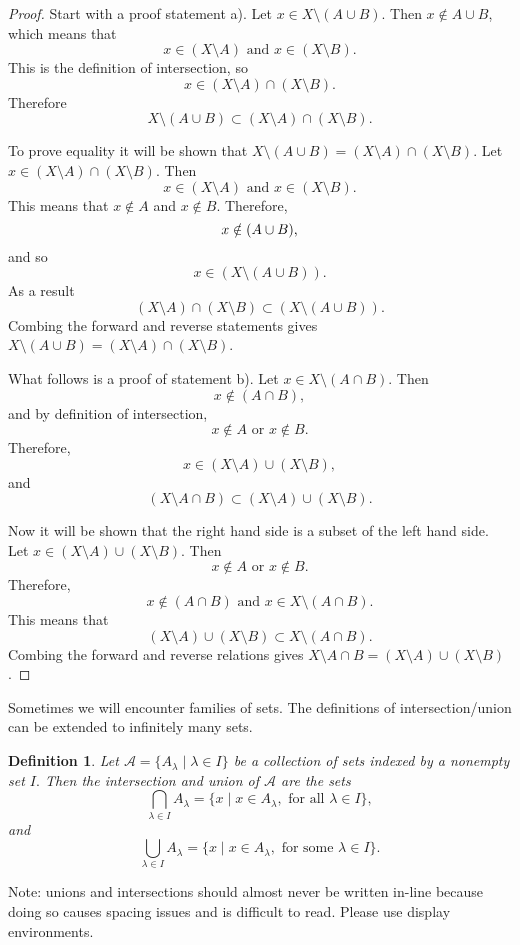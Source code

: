 \documentclass{amsart}
\newtheorem{definition}[theorem]{Definition}
\newcommand{\1}{\mathds{1}}
\numberwithin{equation}{section}
\numberwithin{theorem}{section}
\begin{document}
\begin{proof}
	Start with a proof statement a). Let $x\in X\setminus (A\cup B)$. Then $x\notin A\cup B$, which means that 
	\[x\in (X\setminus A) \text{ and } x\in (X\setminus B).\] This is the definition of intersection, so
	\[x\in (X\setminus A)\cap (X\setminus B).\] 
	Therefore
	\[X\setminus (A\cup B)\subset (X\setminus A)\cap (X\setminus B).\]
	
	To prove equality it will be shown that $X\setminus (A\cup B)=(X\setminus A)\cap (X\setminus B)$. Let $x\in (X\setminus A)\cap (X\setminus B)$. Then 
	\[x\in(X\setminus A) \text{ and } x\in (X\setminus B).\]
	This means that $x\notin A$ and $x\notin B$. Therefore, 
	\[x\notin (A\cup B) \text,\] and so 
	$$x\in (X\setminus (A\cup B)).$$
	As a result $$(X\setminus A)\cap (X\setminus B)\subset (X\setminus (A\cup B)).$$ 
	Combing the forward and reverse statements gives $X\setminus (A\cup B)=(X\setminus A)\cap (X\setminus B)$.
	
	What follows is a proof of statement b). Let $x\in X\setminus (A\cap B)$. Then $$x\notin (A\cap B),$$ and by definition of intersection, $$x\notin A \text{ or } x\notin B.$$ Therefore, $$x\in (X\setminus A)\cup (X\setminus B),$$ and $$(X\setminus A\cap B)\subset (X\setminus A)\cup (X\setminus B).$$ 
	
	Now it will be shown that the right hand side is a subset of the left hand side. Let $x\in (X\setminus A)\cup (X\setminus B)$. Then $$x\notin A \text{ or } x\notin B.$$ Therefore, $$x\notin (A\cap B)\text{ and } x\in X\setminus (A\cap B).$$ This means that $$(X\setminus A)\cup (X\setminus B)\subset X\setminus (A\cap B).$$ Combing the forward and reverse relations gives $X\setminus A\cap B = (X\setminus A)\cup (X\setminus B)$.
\end{proof}

Sometimes we will encounter families of sets. The definitions of intersection/union can be extended to infinitely many sets. 


\begin{definition}

 Let $\mathcal{A}=\{A_\lambda\mid \lambda\in I\}$ be a collection of sets indexed by a nonempty set $I.$ Then the intersection and union of $\mathcal{A}$ are the sets
$$\bigcap_{\lambda\in I} A_\lambda =\{x\mid x\in A_\lambda, \text{ for all } \lambda\in I\},$$
and
$$\bigcup_{\lambda\in I}A_\lambda =\{x\mid x\in A_\lambda, \text{ for some }\lambda\in I\}.$$
\end{definition}

Note: unions and intersections should almost never be written in-line because doing so causes spacing issues and is difficult to read.  Please use display environments.
\end{document}
